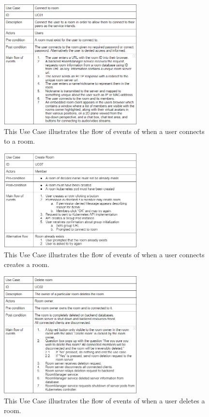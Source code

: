 \begin{figure}[H]
    \centering
    \includegraphics[width=0.65\textwidth]{Pictures/UseCaseConnect.png}
    \caption{This Use Case illustrates the flow of events of when a user connects to a room.}
    \label{fig:usecase1}
\end{figure}

\begin{figure}[H]
    \centering
    \includegraphics[width=0.65\textwidth]{Pictures/UseCaseCreateRoom.png}
    \caption{This Use Case illustrates the flow of events of when a user connects creates a room.}
    \label{fig:usecase2}
\end{figure}

\newpage

\begin{figure}[H]
    \centering
    \includegraphics[width=0.65\textwidth]{Pictures/UseCaseDeleteRoom.png}
    \caption{This Use Case illustrates the flow of events of when a user deletes a room.}
    \label{fig:usecase3}
\end{figure}

